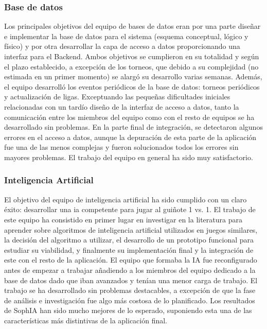\subsubsection*{Base de datos}
Los principales objetivos del equipo de bases de datos eran por una parte diseñar e implementar la base de datos para el sistema (esquema conceptual, lógico y físico) y por otra desarrollar la capa de acceso a datos proporcionando una interfaz para el Backend. Ambos objetivos se cumplieron en su totalidad y según el plazo establecido, a excepción de los torneos, que debido a su complejidad (no estimada en un primer momento) se alargó su desarrollo varias semanas. Además, el equipo desarrolló los eventos periódicos de la base de datos: torneos periódicos y actualización de ligas. Exceptuando las pequeñas dificultades iniciales relacionadas con un tardío diseño de la interfaz de acceso a datos, tanto la comunicación entre los miembros del equipo como con el resto de equipos se ha desarrollado sin problemas. En la parte final de integración, se detectaron algunos errores en el acceso a datos, aunque la depuración de esta parte de la aplicación fue una de las menos complejas y fueron solucionados todos los errores sin mayores problemas. El trabajo del equipo en general ha sido muy satisfactorio. 

\subsubsection*{Inteligencia Artificial}
El objetivo del equipo de inteligencia artificial ha sido cumplido con un claro éxito: desarrollar una ia competente para jugar al guiñote 1 vs. 1. El trabajo de este equipo ha consistido en primer lugar en investigar en la literatura para aprender sobre algoritmos de inteligencia artificial utilizados en juegos similares, la decisión del algoritmo a utilizar, el desarrollo de un prototipo funcional para estudiar su viabilidad, y finalmente su implementación final y la integración de este con el resto de la aplicación. El equipo que formaba la IA fue reconfigurado antes de empezar a trabajar añadiendo a los miembros del equipo dedicado a la base de datos dado que iban avanzados y tenían una menor carga de trabajo. El trabajo se ha desarrollado sin problemas destacables, a excepción de que la fase de análisis e investigación fue algo más costosa de lo planificado. Los resultados de SophIA han sido mucho mejores de lo esperado, suponiendo esta una de las características más distintivas de la aplicación final.

